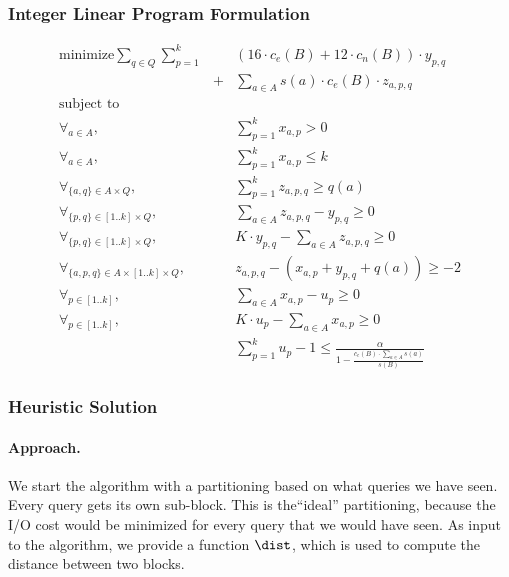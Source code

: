 \subsubsection{Integer Linear Program Formulation}
\begin{eqnarray}
\text{minimize}  
    \sum_{q\in Q} \sum_{p=1}^{k} && (16\cdot c_e(B) + 12\cdot c_n(B))\cdot y_{p,q}\nonumber\\
    &+& \sum_{a\in A} s(a)\cdot c_e(B)\cdot z_{a,p,q} \nonumber\\
\text{subject to}&&\nonumber\\
\forall_{a\in A}, 
    && \sum_{p=1}^{k} x_{a,p} > 0\nonumber\\
\forall_{a\in A}, 
    && \sum_{p=1}^{k} x_{a,p} \leq k\nonumber\\
\forall_{\{a,q\}\in A\times Q},
    &&  \sum_{p=1}^{k} z_{a,p,q} \geq q(a) \nonumber\\
\forall_{\{p,q\}\in [1..k]\times Q}, 
    &&  \sum_{a\in A} z_{a,p,q} - y_{p,q} \geq 0 \nonumber\\
\forall_{\{p,q\}\in [1..k]\times Q}, 
    &&  K\cdot y_{p,q} - \sum_{a\in A} z_{a,p,q}  \geq 0 \nonumber\\
\forall_{\{a,p,q\}\in A\times [1..k]\times Q}, 
    && z_{a,p,q} - (x_{a,p} + y_{p,q} + q(a)) \geq -2 \nonumber\\
\forall_{p\in[1..k]},
    && \sum_{a\in A} x_{a,p} - u_p \geq 0 \nonumber\\
\forall_{p\in[1..k]},
    && K\cdot u_p - \sum_{a\in A} x_{a,p} \geq 0 \nonumber\\    
&& \sum_{p=1}^{k} u_p -1 \leq \frac{\alpha}
  {1-\frac{c_e(B)\cdot \sum_{a\in A} s(a)}{s(B)}} \nonumber
\end{eqnarray}

\subsubsection{Heuristic Solution}

\paragraph*{Approach.} We start the algorithm with a 
 partitioning based on what queries we have seen.
Every query gets its own sub-block. This is the``ideal'' partitioning,
because the I/O cost would be minimized for every query that we would
have seen. As input to the algorithm, we provide a function $\dist$, which
is used to compute the distance between two blocks.

